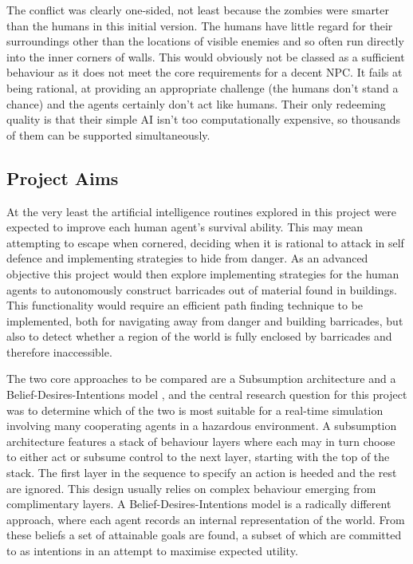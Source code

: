 \documentclass[a4paper,12pt]{article}
\begin{document}
The conflict was clearly one-sided, not least because the zombies were smarter than the humans in this initial version. The humans have little regard for their surroundings other than the locations of visible enemies and so often run directly into the inner corners of walls. This would obviously not be classed as a sufficient behaviour as it does not meet the core requirements for a decent NPC. It fails at being rational, at providing an appropriate challenge (the humans don't stand a chance) and the agents certainly don't act like humans. Their only redeeming quality is that their simple AI isn't too computationally expensive, so thousands of them can be supported simultaneously.

\subsection{Project Aims}\noindent
At the very least the artificial intelligence routines explored in this project were expected to improve each human agent's survival ability. This may mean attempting to escape when cornered, deciding when it is rational to attack in self defence and implementing strategies to hide from danger. As an advanced objective this project would then explore implementing strategies for the human agents to autonomously construct barricades out of material found in buildings. This functionality would require an efficient path finding technique to be implemented, both for navigating away from danger and building barricades, but also to detect whether a region of the world is fully enclosed by barricades and therefore inaccessible.

The two core approaches to be compared are a Subsumption architecture \cite{brooks90} and a Belief-Desires-Intentions model \cite{rao95}, and the central research question for this project was to determine which of the two is most suitable for a real-time simulation involving many cooperating agents in a hazardous environment. A subsumption architecture features a stack of behaviour layers where each may in turn choose to either act or subsume control to the next layer, starting with the top of the stack. The first layer in the sequence to specify an action is heeded and the rest are ignored. This design usually relies on complex behaviour emerging from complimentary layers. A Belief-Desires-Intentions model is a radically different approach, where each agent records an internal representation of the world. From these beliefs a set of attainable goals are found, a subset of which are committed to as intentions in an attempt to maximise expected utility.
\end{document}
